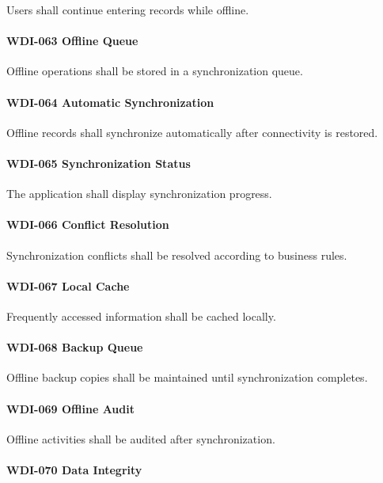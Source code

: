 Users shall continue entering records while offline.

\paragraph{WDI-063 Offline Queue}

Offline operations shall be stored in a synchronization queue.

\paragraph{WDI-064 Automatic Synchronization}

Offline records shall synchronize automatically after connectivity is
restored.

\paragraph{WDI-065 Synchronization Status}

The application shall display synchronization progress.

\paragraph{WDI-066 Conflict Resolution}

Synchronization conflicts shall be resolved according to business rules.

\paragraph{WDI-067 Local Cache}

Frequently accessed information shall be cached locally.

\paragraph{WDI-068 Backup Queue}

Offline backup copies shall be maintained until synchronization
completes.

\paragraph{WDI-069 Offline Audit}

Offline activities shall be audited after synchronization.

\paragraph{WDI-070 Data Integrity}

